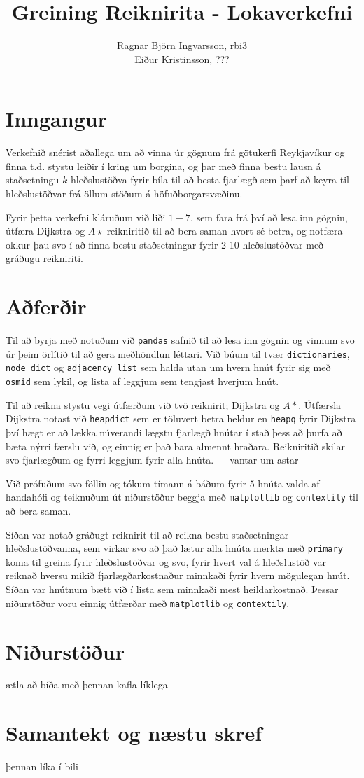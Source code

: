 \documentclass{article}
\title{Greining Reiknirita - Lokaverkefni}
\author{Ragnar Björn Ingvarsson, rbi3 \\ Eiður Kristinsson, ???}
\begin{document}
\renewcommand\thepage{}

	\maketitle

	\newpage
	\setcounter{page}{1}
	\renewcommand\thepage{\arabic{page}}

	\section{Inngangur}

	Verkefnið snérist aðallega um að vinna úr gögnum frá götukerfi Reykjavíkur 
	og finna t.d. stystu leiðir í kring um borgina, og þar með finna bestu 
	lausn á staðsetningu $k$ hleðslustöðva fyrir bíla til að besta fjarlægð 
	sem þarf að keyra til hleðslustöðvar frá öllum stöðum á höfuðborgarsvæðinu. 

	Fyrir þetta verkefni kláruðum við liði $1-7$, sem fara frá því að lesa inn 
	gögnin, útfæra Dijkstra og $A\star$ reikniritið til að bera saman hvort 
	sé betra, og notfæra okkur þau svo í að finna bestu staðsetningar fyrir 
	2-10 hleðslustöðvar með gráðugu reikniriti.

	\section{Aðferðir}

	Til að byrja með notuðum við \texttt{pandas} safnið til að lesa inn 
	gögnin og vinnum svo úr þeim örlítið til að gera meðhöndlun léttari. Við 
	búum til tvær \texttt{dictionaries}, \texttt{node\_dict} og 
	\texttt{adjacency\_list} sem halda utan um hvern hnút fyrir sig með 
	\texttt{osmid} sem lykil, og lista af leggjum sem tengjast hverjum hnút.

	Til að reikna stystu vegi útfærðum við tvö reiknirit; Dijkstra og $A*$. 
	Útfærsla Dijkstra notast við \texttt{heapdict} sem er töluvert betra 
	heldur en \texttt{heapq} fyrir Dijkstra því hægt er að lækka núverandi 
	lægstu fjarlægð hnútar í stað þess að þurfa að bæta nýrri færslu við, og 
	einnig er það bara almennt hraðara. Reikniritið skilar svo fjarlægðum 
	og fyrri leggjum fyrir alla hnúta. ----vantar um astar----

	Við prófuðum svo föllin og tókum tímann á báðum fyrir $5$ hnúta valda af 
	handahófi og teiknuðum út niðurstöður beggja með \texttt{matplotlib} og 
	\texttt{contextily} til að bera saman.

	Síðan var notað gráðugt reiknirit til að reikna bestu staðsetningar 
	hleðslustöðvanna, sem virkar svo að það lætur alla hnúta merkta með 
	\texttt{primary} koma til greina fyrir hleðslustöðvar og svo, fyrir 
	hvert val á hleðslustöð var reiknað hversu mikið fjarlægðarkostnaður 
	minnkaði fyrir hvern mögulegan hnút. Síðan var hnútnum bætt við í lista 
	sem minnkaði mest heildarkostnað. Þessar niðurstöður voru einnig útfærðar 
	með \texttt{matplotlib} og \texttt{contextily}.

	\section{Niðurstöður}

	ætla að bíða með þennan kafla líklega

	\section{Samantekt og næstu skref}

	þennan líka í bili
\end{document}
